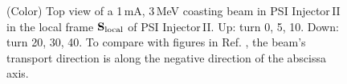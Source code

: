 \documentclass[aps,prstab,twocolumn,superscriptaddress,showpacs]{revtex4}
\newcommand{\bs}[1]{\mathbf #1}
\begin{document}
\begin{figure}
    \caption{(Color) Top view of a 1\,mA, 3\,MeV coasting beam in PSI Injector\,II in the local frame ${\bs{S}_{\RM{local}}}$ of PSI Injector\,II. 
      Up: turn 0, 5, 10. Down: turn 20, 30, 40. To compare with figures in Ref. , 
      the beam's transport direction is along the negative direction of the abscissa axis.}
    \label{fig:coasting1mAA}
\end{figure}





\end{document}
